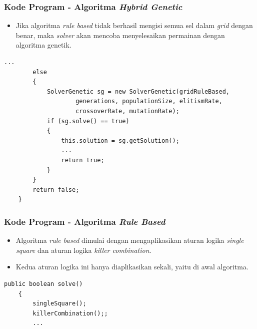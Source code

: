 \documentclass{beamer}
\begin{document}

\begin{frame}[fragile]
\frametitle{Kode Program - Algoritma \textit{Hybrid Genetic}}
\begin{itemize}
\item Jika algoritma \textit{rule based} tidak berhasil mengisi semua sel dalam \textit{grid} dengan benar, maka \textit{solver} akan mencoba menyelesaikan permainan dengan algoritma genetik.
\end{itemize}
\begin{lstlisting}[basicstyle=\tiny]
	...
        else
        {
            SolverGenetic sg = new SolverGenetic(gridRuleBased, 
                    generations, populationSize, elitismRate, 
                    crossoverRate, mutationRate);
            if (sg.solve() == true)
            {
                this.solution = sg.getSolution();
                ...
                return true;
            }
        }
        return false;
    }
\end{lstlisting}
\end{frame}


\begin{frame}[fragile]
\frametitle{Kode Program - Algoritma \textit{Rule Based}}
\begin{itemize}
\item Algoritma \textit{rule based} dimulai dengan mengaplikasikan aturan logika \textit{single square} dan aturan logika \textit{killer combination}.
\item Kedua aturan logika ini hanya diaplikasikan sekali, yaitu di awal algoritma.
\end{itemize}
\begin{lstlisting}[basicstyle=\tiny]
    public boolean solve()
    {
        singleSquare();
        killerCombination();;
        ...
\end{lstlisting}
\end{frame}

\end{document}
